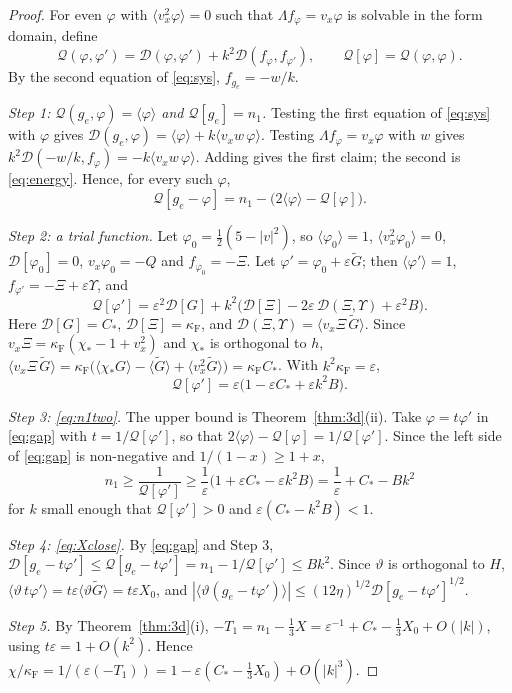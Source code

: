 \documentclass[11pt]{article}
\newcommand{\cD}{\mathcal{D}}
\newcommand{\avg}[1]{\langle #1\rangle}
\theoremstyle{remark}
\begin{document}
\begin{proof}
For even $\varphi$ with $\avg{v_x^2\varphi}=0$ such that
$\Lambda f_\varphi=v_x\varphi$ is solvable in the form domain, define
\[
  \mathcal{Q}(\varphi,\varphi')=\cD(\varphi,\varphi')+k^2\cD(f_\varphi,f_{\varphi'}),
  \qquad \mathcal{Q}[\varphi]=\mathcal{Q}(\varphi,\varphi).
\]
By the second equation of \eqref{eq:sys}, $f_{g_e}=-w/k$.

\emph{Step 1: $\mathcal{Q}(g_e,\varphi)=\avg{\varphi}$ and
$\mathcal{Q}[g_e]=n_1$.} Testing the first equation of \eqref{eq:sys} with
$\varphi$ gives $\cD(g_e,\varphi)=\avg{\varphi}+k\avg{v_xw\,\varphi}$.
Testing $\Lambda f_\varphi=v_x\varphi$ with $w$ gives
$k^2\cD(-w/k,f_\varphi)=-k\avg{v_xw\,\varphi}$. Adding gives the first
claim; the second is \eqref{eq:energy}. Hence, for every such $\varphi$,
\begin{equation}
  \mathcal{Q}[g_e-\varphi]=n_1-\bigl(2\avg{\varphi}-\mathcal{Q}[\varphi]\bigr).
  \label{eq:gap}
\end{equation}

\emph{Step 2: a trial function.} Let $\varphi_0=\tfrac12(5-|v|^2)$, so
$\avg{\varphi_0}=1$, $\avg{v_x^2\varphi_0}=0$, $\cD[\varphi_0]=0$,
$v_x\varphi_0=-Q$ and $f_{\varphi_0}=-\Xi$. Let
$\varphi'=\varphi_0+\varepsilon\tilde G$; then $\avg{\varphi'}=1$,
$f_{\varphi'}=-\Xi+\varepsilon\Upsilon$, and
\[
  \mathcal{Q}[\varphi']=\varepsilon^2\cD[G]
  +k^2\bigl(\cD[\Xi]-2\varepsilon\,\cD(\Xi,\Upsilon)+\varepsilon^2B\bigr).
\]
Here $\cD[G]=C_*$, $\cD[\Xi]=\kappa_{\mathrm F}$, and
$\cD(\Xi,\Upsilon)=\avg{v_x\Xi\,\tilde G}$. Since
$v_x\Xi=\kappa_{\mathrm F}(\chi_*-1+v_x^2)$ and $\chi_*$ is orthogonal to
$h$,
$\avg{v_x\Xi\,\tilde G}=\kappa_{\mathrm F}\bigl(\avg{\chi_*G}-\avg{\tilde G}
+\avg{v_x^2\tilde G}\bigr)=\kappa_{\mathrm F}C_*$. With
$k^2\kappa_{\mathrm F}=\varepsilon$,
\begin{equation}
  \mathcal{Q}[\varphi']=\varepsilon\bigl(1-\varepsilon C_*+\varepsilon k^2B\bigr).
\end{equation}

\emph{Step 3: \eqref{eq:n1two}.} The upper bound is
Theorem~\ref{thm:3d}(ii). Take $\varphi=t\varphi'$ in \eqref{eq:gap} with
$t=1/\mathcal{Q}[\varphi']$, so that
$2\avg{\varphi}-\mathcal{Q}[\varphi]=1/\mathcal{Q}[\varphi']$. Since the
left side of \eqref{eq:gap} is non-negative and $1/(1-x)\ge1+x$,
\[
  n_1\ge\frac{1}{\mathcal{Q}[\varphi']}
  \ge\frac1\varepsilon\bigl(1+\varepsilon C_*-\varepsilon k^2B\bigr)
  =\frac1\varepsilon+C_*-Bk^2
\]
for $k$ small enough that $\mathcal{Q}[\varphi']>0$ and
$\varepsilon(C_*-k^2B)<1$.

\emph{Step 4: \eqref{eq:Xclose}.} By \eqref{eq:gap} and Step 3,
$\cD[g_e-t\varphi']\le\mathcal{Q}[g_e-t\varphi']
=n_1-1/\mathcal{Q}[\varphi']\le Bk^2$. Since $\vartheta$ is orthogonal to
$H$, $\avg{\vartheta\,t\varphi'}=t\varepsilon\avg{\vartheta\tilde G}
=t\varepsilon X_0$, and
$|\avg{\vartheta(g_e-t\varphi')}|\le(12\eta)^{1/2}\cD[g_e-t\varphi']^{1/2}$.

\emph{Step 5.} By Theorem~\ref{thm:3d}(i),
$-T_1=n_1-\tfrac13X=\varepsilon^{-1}+C_*-\tfrac13X_0+O(|k|)$, using
$t\varepsilon=1+O(k^2)$. Hence
$\chi/\kappa_{\mathrm F}=1/(\varepsilon(-T_1))
=1-\varepsilon(C_*-\tfrac13X_0)+O(|k|^3)$.
\end{proof}
\end{document}
